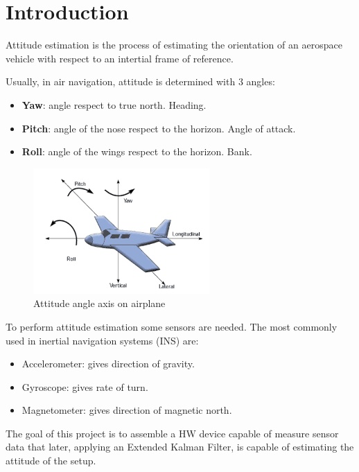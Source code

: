 \section{Introduction}
Attitude estimation is the process of estimating the orientation of an aerospace vehicle with respect to an intertial frame of reference.

Usually, in air navigation, attitude is determined with 3 angles:
\begin{itemize}
\item \textbf{Yaw}: angle respect to true north. Heading.
\item \textbf{Pitch}: angle of the nose respect to the horizon. Angle of attack.
\item \textbf{Roll}: angle of the wings respect to the horizon. Bank.
\end{itemize}
\begin{figure}[h]
\centering
\includegraphics[width=0.6\textwidth]{figures/attitude.png}
\caption{Attitude angle axis on airplane}
\label{fig:attitude}
\end{figure}

To perform attitude estimation some sensors are needed. The most commonly used in inertial navigation systems (INS) are:
\begin{itemize}
\item Accelerometer: gives direction of gravity.
\item Gyroscope: gives rate of turn.
\item Magnetometer: gives direction of magnetic north.
\end{itemize}

The goal of this project is to assemble a HW device capable of measure sensor data that later, applying an Extended Kalman Filter, is capable of estimating the attitude of the setup.